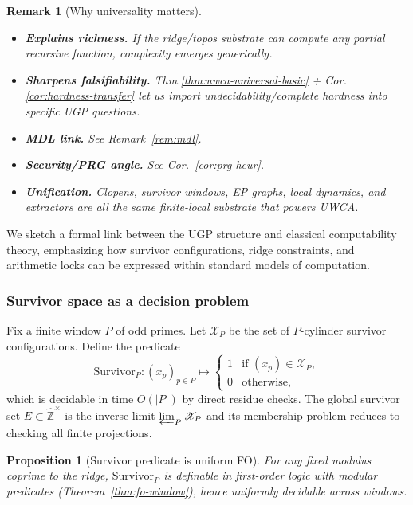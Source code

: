 \documentclass[12pt]{article}
\newtheorem{proposition}[theorem]{Proposition}
\newtheorem{remark}[theorem]{Remark}
\numberwithin{equation}{section}
\newcommand{\Z}{\mathbb{Z}}
\begin{document}
\begin{remark}[Why universality matters]\label{rem:why-universal}

\begin{itemize}[leftmargin=1.1em]
\item \textbf{Explains richness.} If the ridge/topos substrate can compute any partial recursive function, complexity emerges generically.
\item \textbf{Sharpens falsifiability.} Thm.\ref{thm:uwca-universal-basic} + Cor.\ref{cor:hardness-transfer} let us import undecidability/complete hardness into specific UGP questions.
\item \textbf{MDL link.} See Remark~\ref{rem:mdl}.
\item \textbf{Security/PRG angle.} See Cor.~\ref{cor:prg-heur}.
\item \textbf{Unification.} Clopens, survivor windows, EP graphs, local dynamics, and extractors are all the same finite-local substrate that powers UWCA.
\end{itemize}
\end{remark}

We sketch a formal link between the UGP structure and classical computability theory, emphasizing how survivor configurations, ridge constraints, and arithmetic locks can be expressed within standard models of computation.

\subsubsection{Survivor space as a decision problem}
Fix a finite window $P$ of odd primes. Let $\mathscr{X}_P$ be the set of $P$-cylinder survivor configurations. Define the predicate
\[
\mathrm{Survivor}_P: (x_p)_{p\in P} \mapsto \begin{cases}
1 & \text{if $(x_p)\in\mathscr{X}_P$},\\
0 & \text{otherwise},
\end{cases}
\]
which is decidable in time $O(|P|)$ by direct residue checks. The global survivor set $E\subset\widehat{\Z}^{\times}$ is the inverse limit $\varprojlim_P \mathscr{X}_P$ and its membership problem reduces to checking all finite projections.

\begin{proposition}[Survivor predicate is uniform FO]
For any fixed modulus coprime to the ridge, $\mathrm{Survivor}_P$ is definable in first-order logic with modular predicates (Theorem~\ref{thm:fo-window}), hence uniformly decidable across windows.
\end{proposition}
\end{document}
